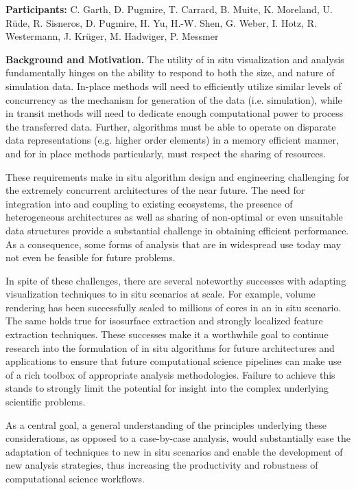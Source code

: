
\license

\textbf{\sffamily Participants:} C. Garth, D. Pugmire, T. Carrard, B. Muite, K. Moreland, U. Rüde, R. Sisneros, D. Pugmire, H. Yu, H.-W. Shen, G. Weber, I. Hotz, R. Westermann, J. Krüger, M. Hadwiger, P. Messmer

\medskip\noindent
\textbf{\sffamily Background and Motivation.} The utility of in situ visualization and analysis fundamentally hinges on the ability to respond to both the size, and nature of simulation data. In-place methods will need to efficiently utilize similar levels of concurrency as the mechanism for generation of the data (i.e. simulation), while in transit methods will need to dedicate enough computational power to process the transferred data. Further, algorithms must be able to operate on disparate data representations (e.g. higher order elements) in a memory efficient manner, and for in place methods particularly, must respect the sharing of resources.

These requirements make in situ algorithm design and engineering challenging for the extremely concurrent architectures of the near future. The need for integration into and coupling to existing ecosystems, the presence of heterogeneous architectures as well as sharing of non-optimal or even unsuitable data structures provide a substantial challenge in obtaining efficient performance. As a consequence, some forms of analysis that are in widespread use today may not even be feasible for future problems.

In spite of these challenges, there are several noteworthy successes with adapting visualization techniques to in situ scenarios at scale. For example, volume rendering has been successfully scaled to millions of cores in an in situ scenario. The same holds true for isosurface extraction and strongly localized feature extraction techniques. These successes make it a worthwhile goal to continue research into the formulation of in situ algorithms for future architectures and applications to ensure that future computational science pipelines can make use of a rich toolbox of appropriate analysis methodologies. Failure to achieve this stands to strongly limit the potential for insight into the complex underlying scientific problems.

As a central goal, a general understanding of the principles underlying these considerations, as opposed to a case-by-case analysis, would substantially ease the adaptation of techniques to new in situ scenarios and enable the development of new analysis strategies, thus increasing the productivity and robustness of computational science workflows.

